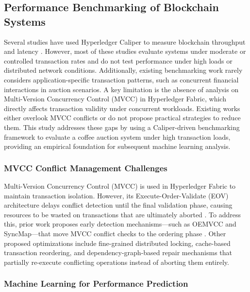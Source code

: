 \documentclass[12pt]{article}
\begin{document}
	\subsection{Performance Benchmarking of Blockchain Systems}
	
	Several studies have used Hyperledger Caliper to measure blockchain throughput and latency \cite{kumar_integrating_2026, kaushal_convergence_2025, thakkar_performance_2018, el_hajji_optimization_2024}. However, most of these studies evaluate systems under moderate or controlled transaction rates and do not test performance under high loads or distributed network conditions. Additionally, existing benchmarking work rarely considers application-specific transaction patterns, such as concurrent financial interactions in auction scenarios. A key limitation is the absence of analysis on Multi-Version Concurrency Control (MVCC) in Hyperledger Fabric, which directly affects transaction validity under concurrent workloads. Existing works either overlook MVCC conflicts or do not propose practical strategies to reduce them. This study addresses these gaps by using a Caliper-driven benchmarking framework to evaluate a coffee auction system under high transaction loads, providing an empirical foundation for subsequent machine learning analysis.
	
	\subsubsection{MVCC Conflict Management Challenges}

Multi-Version Concurrency Control (MVCC) is used in Hyperledger Fabric to maintain transaction isolation. However, its Execute-Order-Validate (EOV) architecture delays conflict detection until the final validation phase, causing resources to be wasted on transactions that are ultimately aborted \cite{Alexandros_Performance_2024}. To address this, prior work proposes early detection mechanisms---such as OEMVCC and SyncMap---that move MVCC conflict checks to the ordering phase \cite{Alexandros_Performance_2024, Helmi_Early_2023}. Other proposed optimizations include fine-grained distributed locking, cache-based transaction reordering, and dependency-graph-based repair mechanisms that partially re-execute conflicting operations instead of aborting them entirely.

\subsubsection{Machine Learning for Performance Prediction}
\end{document}
